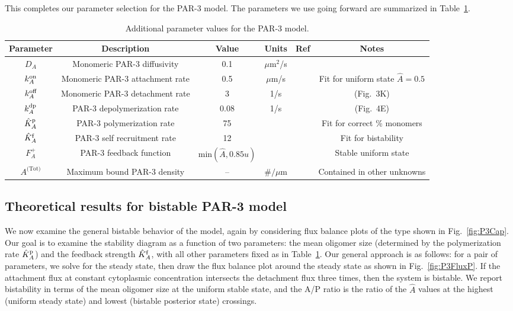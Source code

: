 \documentclass[11pt]{article}
\newcommand{\6}[1]{#1_{\text{6}}}
\newcommand{\3}[1]{#1_{\text{3}}}
\newcommand{\Tot}[1]{#1^\text{(Tot)}}
\newcommand{\A}[1]{#1_A}
\begin{document}
This completes our parameter selection for the PAR-3 model. The parameters we use going forward are summarized in Table\ \ref{tab:paramsP3}.


\begin{table}
\begin{small}
\centering
\begin{tabular}{|c|c|c|c|c|c|}\hline
Parameter & Description & Value & Units & Ref & Notes \\ \hline
$\A{D} $ & Monomeric PAR-3 diffusivity & 0.1 & $\mu$m$^2$/s & \cite{lang2023oligomerization} & \\
$\A{\kon}$ & Monomeric PAR-3 attachment rate & 0.5 & $\mu$m/s & & Fit for uniform state $\hat A=0.5$ \\
$\A{\koff}$ & Monomeric PAR-3 detachment rate &  3& 1/s & \cite{lang2023oligomerization} & (Fig.\ 3K)\\
$\A{\kdp}$ & PAR-3 depolymerization rate & 0.08 & 1/s & \cite{lang2023oligomerization} & (Fig.\ 4E) \\
$\hat{K}^\text{p}_A$ & PAR-3 polymerization rate & 75 & & & Fit for correct \% monomers \cite{lang2023oligomerization}  \\
$\hat{K}^\text{f}_A$ & PAR-3 self recruitment rate &12 & & & Fit for bistability\\
$F_A^+$ & PAR-3 feedback function &$\text{min}\left(\hat A,0.85u\right)$ &  &\cite{lang2022oligomerization} &  Stable uniform state\\
$\Tot{A}$ & Maximum bound PAR-3 density & -- & $\#/\mu$m & & Contained in other unknowns \\ \hline
\end{tabular}
\caption{\label{tab:paramsP3}Additional parameter values for the PAR-3 model. }
\end{small}
\end{table}

\subsection{Theoretical results for bistable PAR-3 model}
We now examine the general bistable behavior of the model, again by considering flux balance plots of the type shown in Fig.\ \ref{fig:P3Cap}. Our goal is to examine the stability diagram as a function of two parameters: the mean oligomer size (determined by the polymerization rate $\hat{K}^\text{p}_A$) and the feedback strength $\hat{K}^\text{f}_A$, with all other parameters fixed as in Table\ \ref{tab:paramsP3}. Our general approach is as follows: for a pair of parameters, we solve for the steady state, then draw the flux balance plot around the steady state as shown in Fig.\ \ref{fig:P3FluxP}. If the attachment flux at constant cytoplasmic concentration intersects the detachment flux three times, then the system is bistable. We report bistability in terms of the mean oligomer size at the uniform stable state, and the A/P ratio is the ratio of the $\hat A$ values at the highest (uniform steady state) and lowest (bistable posterior state) crossings.
\end{document}
